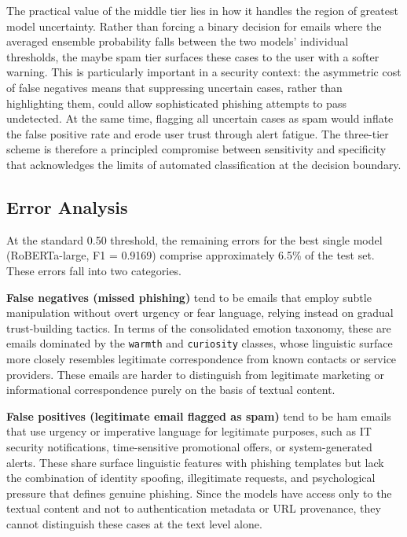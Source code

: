 The practical value of the middle tier lies in how it handles the region of greatest model uncertainty. Rather than forcing a binary decision for emails where the averaged ensemble probability falls between the two models' individual thresholds, the maybe spam tier surfaces these cases to the user with a softer warning. This is particularly important in a security context: the asymmetric cost of false negatives means that suppressing uncertain cases, rather than highlighting them, could allow sophisticated phishing attempts to pass undetected. At the same time, flagging all uncertain cases as spam would inflate the false positive rate and erode user trust through alert fatigue. The three-tier scheme is therefore a principled compromise between sensitivity and specificity that acknowledges the limits of automated classification at the decision boundary.

\subsection{Error Analysis}

At the standard 0.50 threshold, the remaining errors for the best single model (\acs{RoBERTa}-large, F1 = 0.9169) comprise approximately 6.5\% of the test set. These errors fall into two categories.

\textbf{False negatives (missed phishing)} tend to be emails that employ subtle manipulation without overt urgency or fear language, relying instead on gradual trust-building tactics. In terms of the consolidated emotion taxonomy, these are emails dominated by the \texttt{warmth} and \texttt{curiosity} classes, whose linguistic surface more closely resembles legitimate correspondence from known contacts or service providers. These emails are harder to distinguish from legitimate marketing or informational correspondence purely on the basis of textual content.

\textbf{False positives (legitimate email flagged as spam)} tend to be ham emails that use urgency or imperative language for legitimate purposes, such as IT security notifications, time-sensitive promotional offers, or system-generated alerts. These share surface linguistic features with phishing templates but lack the combination of identity spoofing, illegitimate requests, and psychological pressure that defines genuine phishing. Since the models have access only to the textual content and not to authentication metadata or URL provenance, they cannot distinguish these cases at the text level alone.

